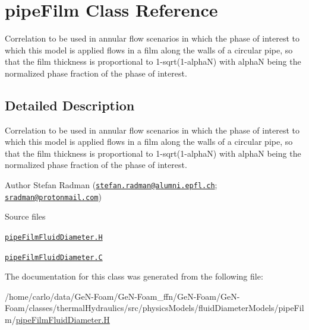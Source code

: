 \hypertarget{classFoam_1_1pipeFilm}{}\section{pipe\+Film Class Reference}
\label{classFoam_1_1pipeFilm}


Correlation to be used in annular flow scenarios in which the phase of interest to which this model is applied flows in a film along the walls of a circular pipe, so that the film thickness is proportional to 1-\/sqrt(1-\/alphaN) with alphaN being the normalized phase fraction of the phase of interest.  




\subsection{Detailed Description}
Correlation to be used in annular flow scenarios in which the phase of interest to which this model is applied flows in a film along the walls of a circular pipe, so that the film thickness is proportional to 1-\/sqrt(1-\/alphaN) with alphaN being the normalized phase fraction of the phase of interest. 

\label{_Description}%
 Author Stefan Radman (\href{mailto:stefan.radman@alumni.epfl.ch}{\tt stefan.\+radman@alumni.\+epfl.\+ch}; \href{mailto:sradman@protonmail.com}{\tt sradman@protonmail.\+com})

\begin{DoxyParagraph}{Source files}

\begin{DoxyItemize}
\item \href{../../../home/carlo/data/GeN-Foam/GeN-Foam_ffn/GeN-Foam/GeN-Foam/classes/thermalHydraulics/src/physicsModels/fluidDiameterModels/pipeFilm/pipeFilmFluidDiameter.H}{\tt pipe\+Film\+Fluid\+Diameter.\+H} 
\item \href{../../../home/carlo/data/GeN-Foam/GeN-Foam_ffn/GeN-Foam/GeN-Foam/classes/thermalHydraulics/src/physicsModels/fluidDiameterModels/pipeFilm/pipeFilmFluidDiameter.C}{\tt pipe\+Film\+Fluid\+Diameter.\+C} 
\end{DoxyItemize}
\end{DoxyParagraph}


The documentation for this class was generated from the following file\+:\begin{DoxyCompactItemize}
\item 
/home/carlo/data/\+Ge\+N-\/\+Foam/\+Ge\+N-\/\+Foam\+\_\+ffn/\+Ge\+N-\/\+Foam/\+Ge\+N-\/\+Foam/classes/thermal\+Hydraulics/src/physics\+Models/fluid\+Diameter\+Models/pipe\+Film/\hyperlink{pipeFilmFluidDiameter_8H}{pipe\+Film\+Fluid\+Diameter.\+H}\end{DoxyCompactItemize}
